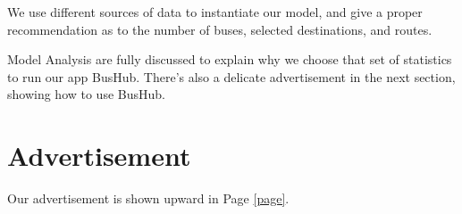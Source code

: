\documentclass{mcmthesis}
\begin{document}
We use different sources of data to instantiate our model, and give a proper recommendation as to the number of buses, selected destinations, and routes.

Model Analysis are fully discussed to explain why we choose that set of statistics to run our app BusHub. There's also a delicate advertisement in the next section, showing how to use BusHub.

\newpage\label{page}


\section{Advertisement}\label{sec:adve}
Our advertisement is shown upward in Page \ref{page}.



\end{document}
